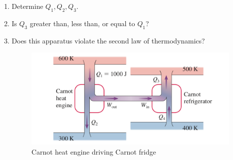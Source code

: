 \documentclass[11pt]{article}
\begin{document}
\begin{enumerate}
\item Determine $Q_1, Q_2, Q_3$.
\item Is $Q_3$ greater than, less than, or equal to $Q_1$?
\item Does this apparatus violate the second law of thermodynamics?

\begin{figure}[h!]
\centering
\includegraphics[width=0.5\linewidth]{Final_1}
\caption{Carnot heat engine driving Carnot fridge}
\end{figure}
\end{enumerate}
\end{document}
